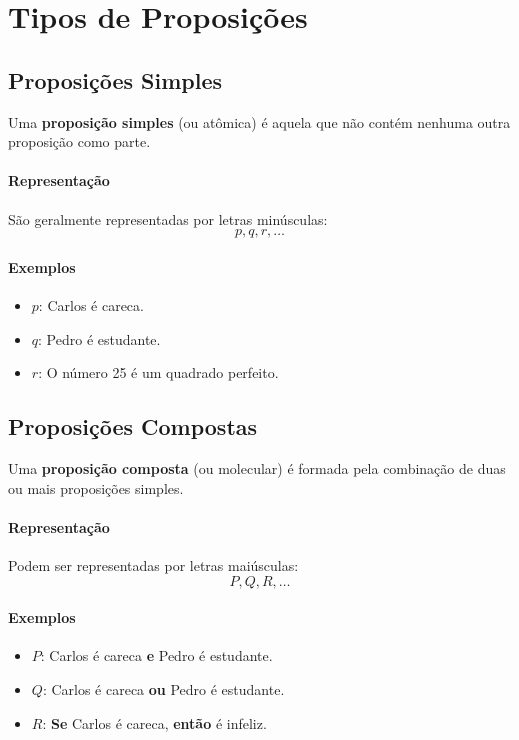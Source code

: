 \section{Tipos de Proposições}

\subsection{Proposições Simples}

Uma \textbf{proposição simples} (ou atômica) é aquela que não contém nenhuma outra proposição como parte.

\paragraph{Representação}

São geralmente representadas por letras minúsculas:
\[
p, q, r, \ldots
\]

\paragraph{Exemplos}

\begin{itemize}
    \item $p$: Carlos é careca.
    \item $q$: Pedro é estudante.
    \item $r$: O número 25 é um quadrado perfeito.
\end{itemize}

\subsection{Proposições Compostas}

Uma \textbf{proposição composta} (ou molecular) é formada pela combinação de duas ou mais proposições simples.

\paragraph{Representação}

Podem ser representadas por letras maiúsculas:
\[
P, Q, R, \ldots
\]

\paragraph{Exemplos}

\begin{itemize}
    \item $P$: Carlos é careca \textbf{e} Pedro é estudante.
    \item $Q$: Carlos é careca \textbf{ou} Pedro é estudante.
    \item $R$: \textbf{Se} Carlos é careca, \textbf{então} é infeliz.
\end{itemize}

